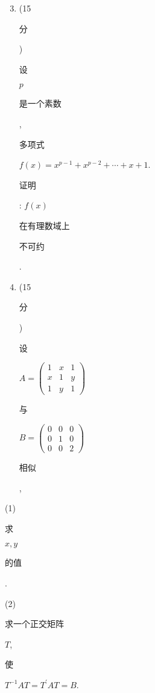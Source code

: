 \documentclass[10pt]{article}
\begin{document}
\begin{enumerate}
  \setcounter{enumi}{2}
  \item (15 \begin{CJK}{UTF8}{mj}分\end{CJK}) \begin{CJK}{UTF8}{mj}设\end{CJK} $p$ \begin{CJK}{UTF8}{mj}是一个素数\end{CJK},\begin{CJK}{UTF8}{mj}多项式\end{CJK} $f(x)=x^{p-1}+x^{p-2}+\cdots+x+1$. \begin{CJK}{UTF8}{mj}证明\end{CJK}: $f(x)$ \begin{CJK}{UTF8}{mj}在有理数域上\end{CJK} \begin{CJK}{UTF8}{mj}不可约\end{CJK}.

  \item (15 \begin{CJK}{UTF8}{mj}分\end{CJK}) \begin{CJK}{UTF8}{mj}设\end{CJK} $A=\left(\begin{array}{lll}1 & x & 1 \\ x & 1 & y \\ 1 & y & 1\end{array}\right)$ \begin{CJK}{UTF8}{mj}与\end{CJK} $B=\left(\begin{array}{lll}0 & 0 & 0 \\ 0 & 1 & 0 \\ 0 & 0 & 2\end{array}\right)$ \begin{CJK}{UTF8}{mj}相似\end{CJK},

\end{enumerate}
(1) \begin{CJK}{UTF8}{mj}求\end{CJK} $x, y$ \begin{CJK}{UTF8}{mj}的值\end{CJK}.

(2) \begin{CJK}{UTF8}{mj}求一个正交矩阵\end{CJK} $T$, \begin{CJK}{UTF8}{mj}使\end{CJK} $T^{-1} A T=T^{\prime} A T=B$.
\end{document}
